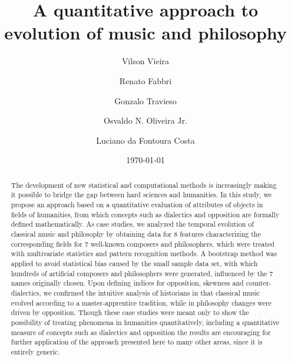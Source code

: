 \documentclass[
 aip,
 jmp,
 amsmath,amssymb,
 reprint,
]{revtex4-1}
\begin{document}

\title{A quantitative approach to evolution of music
  and philosophy}

\author{Vilson Vieira}

\author{Renato Fabbri}

\author{Gonzalo Travieso}

\author{Osvaldo N. Oliveira Jr.}

\author{Luciano da Fontoura Costa}

\date{\today}
\begin{abstract}
The development of new statistical and computational methods is
increasingly making it possible to bridge the gap between hard
sciences and humanities. In this study, we propose an approach based
on a quantitative evaluation of attributes of objects in fields of
humanities, from which concepts such as dialectics and opposition are
formally defined mathematically. As case studies, we analyzed the
temporal evolution of classical music and philosophy by obtaining data
for 8 features characterizing the corresponding fields for 7
well-known composers and philosophers, which were treated with
multivariate statistics and pattern recognition methods. A bootstrap
method was applied to avoid statistical bias caused by the small
sample data set, with which hundreds of artificial composers and
philosophers were generated, influenced by the 7 names originally
chosen.  Upon defining indices for opposition, skewness and
counter-dialectics, we confirmed the intuitive analysis of historians
in that classical music evolved according to a master-apprentice
tradition, while in philosophy changes were driven by
opposition. Though these case studies were meant only to show the
possibility of treating phenomena in humanities quantitatively,
including a quantitative measure of concepts such as dialectics and
opposition the results are encouraging for further application of the
approach presented here to many other areas, since it is entirely
generic.
\end{abstract}
\maketitle
\end{document}
